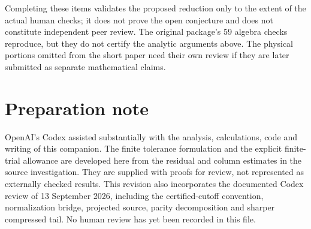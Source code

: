 Completing these items validates the proposed reduction only to the extent
of the actual human checks; it does not prove the open conjecture and does
not constitute independent peer review. The original package's 59 algebra
checks reproduce, but they do not certify the analytic arguments above.
The physical portions omitted from the short paper need their own review
if they are later submitted as separate mathematical claims.

\section*{Preparation note}
OpenAI's Codex assisted substantially with the analysis, calculations, code
and writing of this companion. The finite tolerance formulation and the
explicit finite-trial allowance are developed here from the residual and
column estimates in the source investigation. They are supplied with proofs
for review, not represented as externally checked results. This revision
also incorporates the documented Codex review of 13 September 2026,
including the certified-cutoff convention, normalization bridge,
projected source, parity decomposition and sharper compressed tail.
No human review has yet been recorded in this file.
\clearpage


